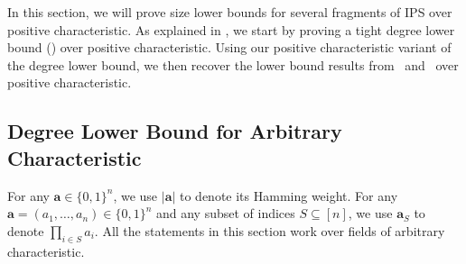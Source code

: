 \documentclass[11pt]{article}
\newcommand{\Boo}{\{0,1 \}}
\renewcommand{\comment}[2]{\marginpar{\tiny{\textbf{#1: }\textit{#2}}}}
\newcommand{\nl}[1]{\comment{NL}{#1}}
\begin{document}


In this section, we will prove size lower bounds for several fragments of IPS over positive characteristic. As explained in , we start by proving a tight degree lower bound () over positive characteristic. Using our positive characteristic variant of the degree lower bound, we then recover the lower bound results from~\cite{FSTW21} and~\cite{GHT} over positive characteristic. 

\subsection{Degree Lower Bound for Arbitrary Characteristic}

For any $\mathbf{a} \in \Boo^n$, we use $|\mathbf{a}|$ to denote its Hamming weight.
For any $\mathbf{a} = (a_1, \dots, a_n) \in \Boo^n$ and any subset of indices $S\subseteq [n]$, we use $\mathbf{a}_S$ to denote $\prod_{i\in S}a_i$.
All the statements in this section work over fields of arbitrary characteristic. 
\end{document}

